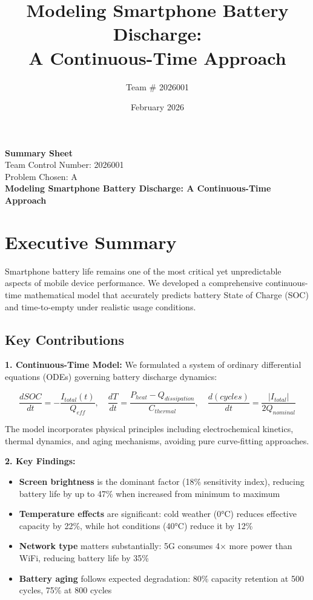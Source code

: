 \documentclass[12pt]{article}
\title{Modeling Smartphone Battery Discharge: \\
A Continuous-Time Approach}
\author{Team \# 2026001}
\date{February 2026}
\begin{document}
\thispagestyle{empty}
\begin{center}
{\LARGE \textbf{Summary Sheet}}\\[1em]
{\Large Team Control Number: 2026001}\\[1em]
{\Large Problem Chosen: A}\\[2em]

{\Large \textbf{Modeling Smartphone Battery Discharge: A Continuous-Time Approach}}\\[2em]
\end{center}

\section*{Executive Summary}

Smartphone battery life remains one of the most critical yet unpredictable aspects of mobile device performance. We developed a comprehensive continuous-time mathematical model that accurately predicts battery State of Charge (SOC) and time-to-empty under realistic usage conditions.

\subsection*{Key Contributions}

\textbf{1. Continuous-Time Model:} We formulated a system of ordinary differential equations (ODEs) governing battery discharge dynamics:

\begin{equation*}
\frac{dSOC}{dt} = -\frac{I_{total}(t)}{Q_{eff}}, \quad 
\frac{dT}{dt} = \frac{P_{heat} - Q_{dissipation}}{C_{thermal}}, \quad
\frac{d(cycles)}{dt} = \frac{|I_{total}|}{2Q_{nominal}}
\end{equation*}

The model incorporates physical principles including electrochemical kinetics, thermal dynamics, and aging mechanisms, avoiding pure curve-fitting approaches.

\textbf{2. Key Findings:}
\begin{itemize}[noitemsep]
\item \textbf{Screen brightness} is the dominant factor (18\% sensitivity index), reducing battery life by up to 47\% when increased from minimum to maximum
\item \textbf{Temperature effects} are significant: cold weather (0°C) reduces effective capacity by 22\%, while hot conditions (40°C) reduce it by 12\%
\item \textbf{Network type} matters substantially: 5G consumes 4× more power than WiFi, reducing battery life by 35\%
\item \textbf{Battery aging} follows expected degradation: 80\% capacity retention at 500 cycles, 75\% at 800 cycles
\end{itemize}
\end{document}
